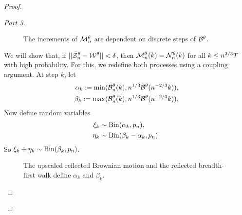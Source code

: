 \begin{proof}
\begin{proof}[Part 3]
\begin{figure}[ht]
	\centering
	
	\caption{The increments of $\mathcal{M}_n^{\theta}$ are dependent on discrete steps of $\mathcal{B}^{\theta}$.} 
	\label{F: Mn}
\end{figure}

We will show that, if $||\bar{\mathcal{Z}}^{\theta}_n - \mathcal{W}^{\theta}|| < \delta$, 
then $\mathcal{M}_n^{\theta}(k) = \mathcal{N}_n^{\theta}(k)$ for all $k \leq n^{2 / 3}T$ with high probability.
For this, we redefine both processes using a coupling argument.
At step $k$, let
\begin{equation} \label{E: def alpha beta}
\begin{aligned}
\alpha_k := \min(\mathcal{B}_n^{\theta}(k), n^{1 / 3}\mathcal{B}^{\theta}(n^{-2 / 3}k)), \\
\beta_k := \max(\mathcal{B}_n^{\theta}(k), n^{1 / 3}\mathcal{B}^{\theta}(n^{-2 / 3}k)),
\end{aligned}
\end{equation}
Now define random variables
\begin{equation} \label{E: def xi eta}
\begin{aligned}
\xi_k &\sim \operatorname*{Bin}(\alpha_k, p_n), \\
\eta_k &\sim \operatorname*{Bin}(\beta_k - \alpha_k, p_n).
\end{aligned}
\end{equation}
So $\xi_k + \eta_k \sim \operatorname*{Bin}(\beta_k, p_n)$.

\begin{figure}[ht]
	\centering
	
	\caption{The upscaled reflected Brownian motion and the reflected breadth-first walk define $\alpha_k$ and $\beta_k$.} 
	\label{F: BM BF-walk}
\end{figure}


\end{proof}
\end{proof}
